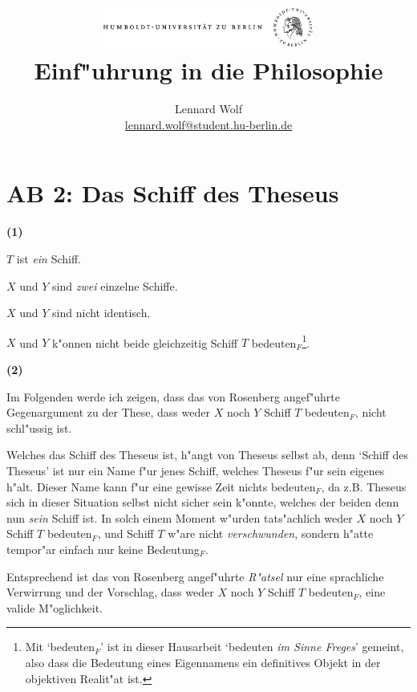 \documentclass[a4paper]{article}
\date{\vspace{-3ex}}
\begin{document}
\title{
	\includegraphics*[width=0.52\textwidth]{images/hu_logo.png}\\
	\vspace{10pt}
	Einf"uhrung in die Philosophie}
\author{Lennard Wolf\\
        \href{mailto:lennard.wolf@student.hu-berlin.de}{lennard.wolf@student.hu-berlin.de}}
\maketitle


\section*{AB 2: Das Schiff des Theseus}
\large
\textbf{(1)}
\begin{description}[leftmargin=!,labelwidth=\widthof{\bfseries P22}]
  \item[P1] $T$ ist \emph{ein} Schiff.
  \item[P2] $X$ und $Y$ sind \emph{zwei} einzelne Schiffe.
  \item[P3] $X$ und $Y$ sind nicht identisch.
  \item[K] $X$ und $Y$ k"onnen nicht beide gleichzeitig Schiff $T$ bedeuten$_{F}$\footnote{Mit `bedeuten$_{F}$' ist in dieser Hausarbeit `bedeuten \emph{im Sinne Freges}' gemeint, also dass die Bedeutung eines Eigennamens ein definitives Objekt in der objektiven Realit"at ist. }.
\end{description}
\vspace{8pt}
\textbf{(2)}

Im Folgenden werde ich zeigen, dass das von Rosenberg angef"uhrte Gegenargument zu der These, dass weder $X$ noch $Y$ Schiff $T$ bedeuten$_{F}$, nicht schl"ussig ist. 

Welches das Schiff des Theseus ist, h"angt von Theseus selbst ab, denn `Schiff des Theseus' ist nur ein Name f"ur jenes Schiff, welches Theseus f"ur sein eigenes h"alt. Dieser Name kann f"ur eine gewisse Zeit nichts bedeuten$_{F}$, da z.B. Theseus sich in dieser Situation selbst nicht sicher sein k"onnte, welches der beiden denn nun \emph{sein} Schiff ist. In solch einem Moment w"urden tats"achlich weder $X$ noch $Y$ Schiff $T$ bedeuten$_{F}$, und Schiff $T$ w"are nicht \emph{verschwunden}, sondern h"atte tempor"ar einfach nur keine Bedeutung$_{F}$.

Entsprechend ist das von Rosenberg angef"uhrte \emph{R"atsel} nur eine sprachliche Verwirrung und der Vorschlag, dass weder $X$ noch $Y$ Schiff $T$ bedeuten$_{F}$, eine valide M"oglichkeit.
\end{document}
